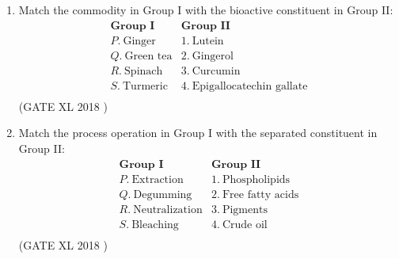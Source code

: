 \documentclass[14pt]{extarticle}
\begin{document}
\begin{flushleft}
\begin{enumerate}
\item Match the commodity in Group I with the bioactive constituent in Group II:
\[
\begin{array}{ll}
\textbf{Group I} & \textbf{Group II} \\
P. \ \text{Ginger} & 1. \ \text{Lutein} \\
Q. \ \text{Green tea} & 2. \ \text{Gingerol} \\
R. \ \text{Spinach} & 3. \ \text{Curcumin} \\
S. \ \text{Turmeric} & 4. \ \text{Epigallocatechin gallate} \\
\end{array}
\]
\hfill(GATE XL 2018 )\\
\begin{enumerate}[label=(\Alph*)]
\end{enumerate}

\item Match the process operation in Group I with the separated constituent in Group II:
\[
\begin{array}{ll}
\textbf{Group I} & \textbf{Group II} \\
P. \ \text{Extraction} & 1. \ \text{Phospholipids} \\
Q. \ \text{Degumming} & 2. \ \text{Free fatty acids} \\
R. \ \text{Neutralization} & 3. \ \text{Pigments} \\
S. \ \text{Bleaching} & 4. \ \text{Crude oil} \\
\end{array}
\]
\hfill(GATE XL 2018 )\\
\begin{enumerate}[label=(\Alph*)]
\end{enumerate}


\end{enumerate}
\end{flushleft}
\end{document}
